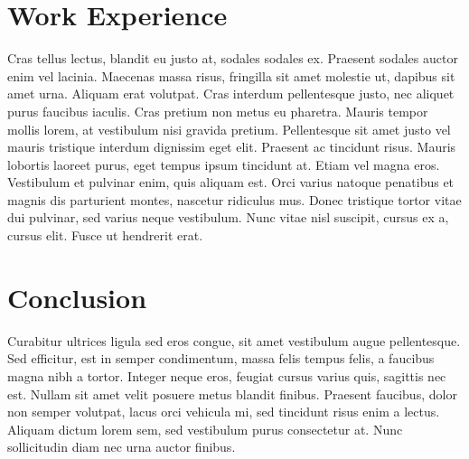 \documentclass[color, font]{sop}
\begin{document}
\section*{Work Experience}
Cras tellus lectus, blandit eu justo at, sodales sodales ex. Praesent sodales auctor enim vel lacinia. Maecenas massa risus, fringilla sit amet molestie ut, dapibus sit amet urna. Aliquam erat volutpat. Cras interdum pellentesque justo, nec aliquet purus faucibus iaculis. Cras pretium non metus eu pharetra. Mauris tempor mollis lorem, at vestibulum nisi gravida pretium. Pellentesque sit amet justo vel mauris tristique interdum dignissim eget elit. Praesent ac tincidunt risus. Mauris lobortis laoreet purus, eget tempus ipsum tincidunt at. Etiam vel magna eros. Vestibulum et pulvinar enim, quis aliquam est. Orci varius natoque penatibus et magnis dis parturient montes, nascetur ridiculus mus. Donec tristique tortor vitae dui pulvinar, sed varius neque vestibulum. Nunc vitae nisl suscipit, cursus ex a, cursus elit. Fusce ut hendrerit erat. 

\section*{Conclusion}
Curabitur ultrices ligula sed eros congue, sit amet vestibulum augue pellentesque. Sed efficitur, est in semper condimentum, massa felis tempus felis, a faucibus magna nibh a tortor. Integer neque eros, feugiat cursus varius quis, sagittis nec est. Nullam sit amet velit posuere metus blandit finibus. Praesent faucibus, dolor non semper volutpat, lacus orci vehicula mi, sed tincidunt risus enim a lectus. Aliquam dictum lorem sem, sed vestibulum purus consectetur at. Nunc sollicitudin diam nec urna auctor finibus.
\end{document}
